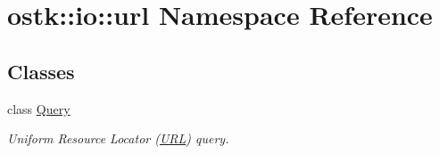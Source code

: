 \hypertarget{namespaceostk_1_1io_1_1url}{}\section{ostk\+:\+:io\+:\+:url Namespace Reference}
\label{namespaceostk_1_1io_1_1url}
\subsection*{Classes}
\begin{DoxyCompactItemize}
\item 
class \hyperlink{classostk_1_1io_1_1url_1_1_query}{Query}
\begin{DoxyCompactList}\small\item\em Uniform Resource Locator (\hyperlink{classostk_1_1io_1_1_u_r_l}{U\+RL}) query. \end{DoxyCompactList}\end{DoxyCompactItemize}
